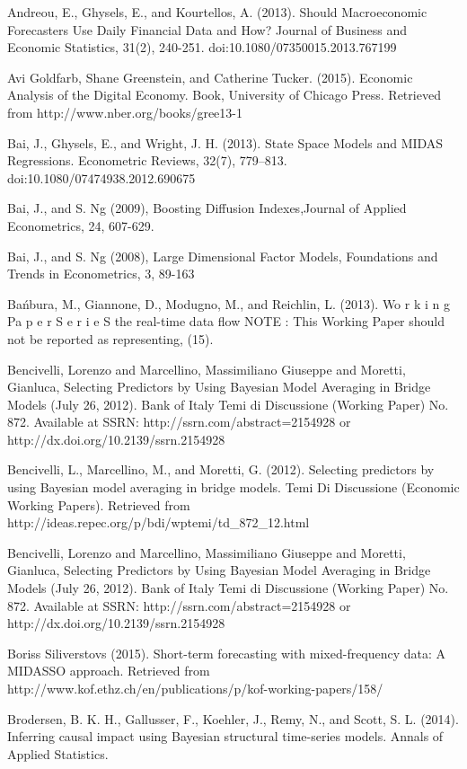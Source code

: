 Andreou, E., Ghysels, E., and Kourtellos, A. (2013). Should Macroeconomic Forecasters Use Daily Financial Data and How? Journal of Business and Economic Statistics, 31(2), 240-251. doi:10.1080/07350015.2013.767199


Avi Goldfarb, Shane Greenstein, and Catherine Tucker. (2015). Economic Analysis of the Digital Economy. Book, University of Chicago Press. Retrieved from http://www.nber.org/books/gree13-1

Bai, J., Ghysels, E., and Wright, J. H. (2013). State Space Models and MIDAS Regressions. Econometric Reviews, 32(7), 779–813. doi:10.1080/07474938.2012.690675



Bai, J., and S. Ng (2009), Boosting Diffusion Indexes,Journal of Applied Econometrics, 24, 607-629.



Bai, J., and S. Ng (2008), Large Dimensional Factor Models, Foundations and Trends in Econometrics, 3, 89-163



Bańbura, M., Giannone, D., Modugno, M., and Reichlin, L. (2013). Wo r k i n g Pa p e r S e r i e S the real-time data flow NOTE : This Working Paper should not be reported as representing, (15).


Bencivelli, Lorenzo and Marcellino, Massimiliano Giuseppe and Moretti, Gianluca, Selecting Predictors by Using Bayesian Model Averaging in Bridge Models (July 26, 2012). Bank of Italy Temi di Discussione (Working Paper) No. 872. Available at SSRN: http://ssrn.com/abstract=2154928 or http://dx.doi.org/10.2139/ssrn.2154928 


Bencivelli, L., Marcellino, M., and Moretti, G. (2012). Selecting predictors by using Bayesian model averaging in bridge models. Temi Di Discussione (Economic Working Papers). Retrieved from http://ideas.repec.org/p/bdi/wptemi/td\_872\_12.html

Bencivelli, Lorenzo and Marcellino, Massimiliano Giuseppe and Moretti, Gianluca, Selecting Predictors by Using Bayesian Model Averaging in Bridge Models (July 26, 2012). Bank of Italy Temi di Discussione (Working Paper) No. 872. Available at SSRN: http://ssrn.com/abstract=2154928 or http://dx.doi.org/10.2139/ssrn.2154928 


Boriss Siliverstovs (2015). Short-term forecasting with mixed-frequency data: A MIDASSO approach. Retrieved from http://www.kof.ethz.ch/en/publications/p/kof-working-papers/158/

Brodersen, B. K. H., Gallusser, F., Koehler, J., Remy, N., and Scott, S. L. (2014). Inferring causal impact using Bayesian structural time-series models. Annals of Applied Statistics.

